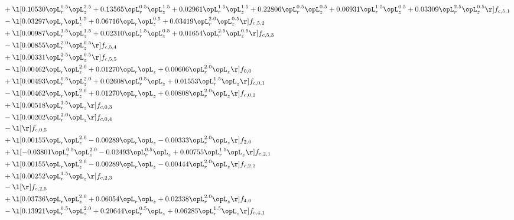 \begin{alignat}{2}
& + \l[  0.10530 \opL_r^{0.5} \opL_z^{2.5} +  0.13565 \opL_r^{0.5} \opL_z^{1.5} +  0.02961 \opL_r^{1.5} \opL_z^{1.5} +  0.22806 \opL_r^{0.5} \opL_z^{0.5} +  0.06931 \opL_r^{1.5} \opL_z^{0.5} +  0.03309 \opL_r^{2.5} \opL_z^{0.5}  \r] f_{c,5,1} \nonumber \\ 
& - \l[  0.03297 \opL_r \opL_z^{1.5} +  0.06716 \opL_r \opL_z^{0.5} +  0.03419 \opL_r^{2.0} \opL_z^{0.5}  \r] f_{c,5,2} \nonumber \\ 
& + \l[  0.00987 \opL_r^{1.5} \opL_z^{1.5} +  0.02310 \opL_r^{1.5} \opL_z^{0.5} +  0.01654 \opL_r^{2.5} \opL_z^{0.5}  \r] f_{c,5,3} \nonumber \\ 
& - \l[  0.00855 \opL_r^{2.0} \opL_z^{0.5}  \r] f_{c,5,4} \nonumber \\ 
& + \l[  0.00331 \opL_r^{2.5} \opL_z^{0.5}  \r] f_{c,5,5} \nonumber \\ 
& - \l[  0.00462 \opL_r \opL_z^{2.0} +  0.01270 \opL_r \opL_z +  0.00606 \opL_r^{2.0} \opL_z  \r] f_{0,0} \nonumber \\ 
& + \l[  0.00493 \opL_r^{0.5} \opL_z^{2.0} +  0.02608 \opL_r^{0.5} \opL_z +  0.01553 \opL_r^{1.5} \opL_z  \r] f_{c,0,1} \nonumber \\ 
& - \l[  0.00462 \opL_r \opL_z^{2.0} +  0.01270 \opL_r \opL_z +  0.00808 \opL_r^{2.0} \opL_z  \r] f_{c,0,2} \nonumber \\ 
& + \l[  0.00518 \opL_r^{1.5} \opL_z  \r] f_{c,0,3} \nonumber \\ 
& - \l[  0.00202 \opL_r^{2.0} \opL_z  \r] f_{c,0,4} \nonumber \\ 
& - \l[  \r] f_{c,0,5} \nonumber \\ 
& + \l[  0.00155 \opL_r \opL_z^{2.0}   -0.00289 \opL_r \opL_z   -0.00333 \opL_r^{2.0} \opL_z  \r] f_{2,0} \nonumber \\ 
& + \l[  -0.03801 \opL_r^{0.5} \opL_z^{2.0}   -0.02493 \opL_r^{0.5} \opL_z +  0.00755 \opL_r^{1.5} \opL_z  \r] f_{c,2,1} \nonumber \\ 
& + \l[  0.00155 \opL_r \opL_z^{2.0}   -0.00289 \opL_r \opL_z   -0.00444 \opL_r^{2.0} \opL_z  \r] f_{c,2,2} \nonumber \\ 
& + \l[  0.00252 \opL_r^{1.5} \opL_z  \r] f_{c,2,3} \nonumber \\ 
& - \l[  \r] f_{c,2,5} \nonumber \\ 
& + \l[  0.03736 \opL_r \opL_z^{2.0} +  0.06054 \opL_r \opL_z +  0.02338 \opL_r^{2.0} \opL_z  \r] f_{4,0} \nonumber \\ 
& - \l[  0.13921 \opL_r^{0.5} \opL_z^{2.0} +  0.20644 \opL_r^{0.5} \opL_z +  0.06285 \opL_r^{1.5} \opL_z  \r] f_{c,4,1} \nonumber \\ 

\end{alignat}

